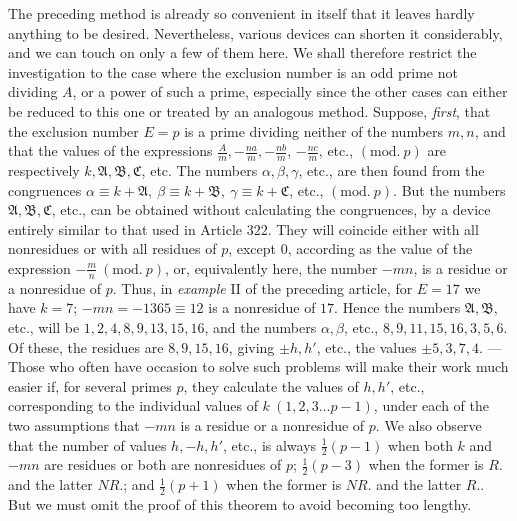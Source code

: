 The preceding method is already so convenient in itself that it leaves hardly anything to be desired. Nevertheless, various devices can shorten it considerably, and we can touch on only a few of them here. We shall therefore restrict the investigation to the case where the exclusion number is an odd prime not dividing \(A\), or a power of such a prime, especially since the other cases can either be reduced to this one or treated by an analogous method. Suppose, \textit{first}, that the exclusion number \(E=p\) is a prime dividing neither of the numbers \(m,\allowbreak n\), and that the values of the expressions \(\frac Am,\allowbreak -\frac{na}m,\allowbreak -\frac{nb}m\), \(-\frac{nc}m\), etc., \((\mathrm{mod.}\ p)\) are respectively \(k,\allowbreak \mathfrak A,\allowbreak \mathfrak B,\allowbreak \mathfrak C\), etc. The numbers \(\alpha,\allowbreak \beta,\allowbreak \gamma\), etc., are then found from the congruences \(\alpha\equiv k+\mathfrak A,\allowbreak \ \beta\equiv k+\mathfrak B,\allowbreak \ \gamma\equiv k+\mathfrak C\), etc., \((\mathrm{mod.}\ p)\). But the numbers \(\mathfrak A,\allowbreak \mathfrak B,\allowbreak \mathfrak C\), etc., can be obtained without calculating the congruences, by a device entirely similar to that used in Article \(322\). They will coincide either with all nonresidues or with all residues of \(p\), except \(0\), according as the value of the expression \(-\frac mn\ (\mathrm{mod.}\ p)\), or, equivalently here, the number \(-mn\), is a residue or a nonresidue of \(p\). Thus, in \textit{example} II of the preceding article, for \(E=17\) we have \(k=7\); \(-mn=-1365\equiv12\) is a nonresidue of \(17\). Hence the numbers \(\mathfrak A,\allowbreak \mathfrak B\), etc., will be \(1,\allowbreak 2,\allowbreak 4,\allowbreak 8,\allowbreak 9,\allowbreak 13,\allowbreak 15,\allowbreak 16\), and the numbers \(\alpha,\allowbreak \beta\), etc., \(8,\allowbreak 9,\allowbreak 11,\allowbreak 15,\allowbreak 16,\allowbreak 3,\allowbreak 5,\allowbreak 6\). Of these, the residues are \(8,\allowbreak 9,\allowbreak 15,\allowbreak 16\), giving \(\pm h,\allowbreak h'\), etc., the values \(\pm5,\allowbreak 3,\allowbreak 7,\allowbreak 4\). — Those who often have occasion to solve such problems will make their work much easier if, for several primes \(p\), they calculate the values of \(h,\allowbreak h'\), etc., corresponding to the individual values of \(k\ (1,\allowbreak 2,\allowbreak 3\ldots p-1)\), under each of the two assumptions that \(-mn\) is a residue or a nonresidue of \(p\). We also observe that the number of values \(h,\allowbreak -h,\allowbreak h'\), etc., is always \(\frac12(p-1)\) when both \(k\) and \(-mn\) are residues or both are nonresidues of \(p\); \(\frac12(p-3)\) when the former is \(R.\) and the latter \(NR.\); and \(\frac12(p+1)\) when the former is \(NR.\) and the latter \(R.\). But we must omit the proof of this theorem to avoid becoming too lengthy.

